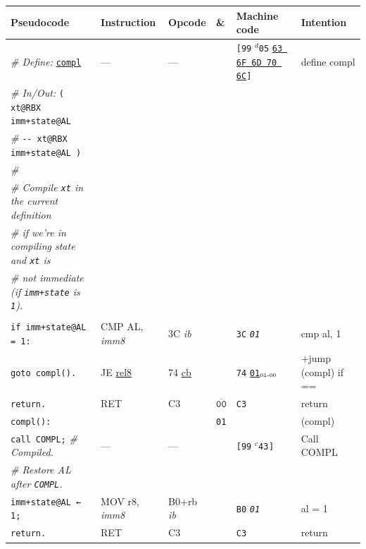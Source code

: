 \documentclass[a4paper,12pt,final]{article}
\begin{document}
\begin{table}[!htbp] \begin{adjustwidth}{-1cm}{-1cm} \fontsize{10}{12.000000}\selectfont
\begin{center}
\begin{tabular}{l|ll|l|lH}
\textbf{Pseudocode} & \textbf{Instruction} & \textbf{Opcode} & \textbf{\&} & \textbf{Machine code} & \textbf{Intention}\\[0pt]
\hline
\emph{\# Define:} \uline{\texttt{compl}} & --- & --- &  & \texttt{[99} \(^{d}\)​\texttt{05} \uline{\texttt{63 6F 6D 70 6C}}​\texttt{]} & define compl\\[0pt]
\emph{\# In/Out:}    \texttt{( xt@RBX imm+state@AL} &  &  &  &  & \\[0pt]
\emph{\#}\hspace{3.35em} \texttt{-{}-{} xt@RBX imm+state@AL )} &  &  &  &  & \\[0pt]
\emph{\#} &  &  &  &  & \\[0pt]
\emph{\# Compile \texttt{xt} in the current definition} &  &  &  &  & \\[0pt]
\emph{\# if we're in compiling state and \texttt{xt} is} &  &  &  &  & \\[0pt]
\emph{\# not immediate (if \texttt{imm+state} is \texttt{1}).} &  &  &  &  & \\[0pt]
 &  &  &  &  & \\[0pt]
\hspace{1.053000em} \texttt{if imm+state@AL = 1:} & CMP AL, \emph{imm8} & 3C \emph{ib} &  & \texttt{3C} \emph{\texttt{01}} & cmp al, 1\\[0pt]
\hspace{2.106000em}   \texttt{goto compl().} & JE \uline{rel8} & 74 \uline{cb} &  & \texttt{74} \uline{\texttt{01}}​\(_{\text{\tiny 01-00}}\) & +jump (compl) if ==\\[0pt]
\hspace{1.053000em} \texttt{return.} & RET & C3 & \(\overline{\texttt{00}}\) & \texttt{C3} & return\\[0pt]
\texttt{compl():} &  &  & \texttt{01} &  & (compl)\\[0pt]
\hspace{1.053000em} \texttt{call COMPL;}  \emph{\# Compiled.} & --- & --- &  & \texttt{[99} \(^{c}\)​\texttt{43}​\(_{}\)​\texttt{]} & Call COMPL\\[0pt]
\hspace{1.053000em} \emph{\# Restore AL after \texttt{COMPL}.} &  &  &  &  & \\[0pt]
\hspace{1.053000em} \texttt{imm+state@AL ← 1;} & MOV r8, \emph{imm8} & B0+rb \emph{ib} &  & \texttt{B0} \emph{\texttt{01}} & al = 1\\[0pt]
\hspace{1.053000em} \texttt{return.} & RET & C3 &  & \texttt{C3} & return\\[0pt]
\end{tabular}


\end{center}
\end{adjustwidth}
\end{table}
\end{document}
